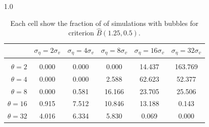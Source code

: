 \documentclass[12pt]{article}
\begin{document}
\begin{table}[h!]
\vspace{10pt}
\begin{subtable}{1.0\textwidth}
    \centering
\begin{tabular}{rccccc}
\hline  
            & \multicolumn{1}{l}{$\sigma_{\eta} =2\sigma_{v}$} & \multicolumn{1}{l}{$\sigma_{\eta} =4\sigma_{v}$} & \multicolumn{1}{l}{$\sigma_{\eta} =8\sigma_{v}$} & \multicolumn{1}{l}{$\sigma_{\eta} =16\sigma_{v}$} & \multicolumn{1}{l}{$\sigma_{\eta} =32\sigma_{v}$} \\ \hline  \vspace{-3mm} \\        
$\theta=2$  & 0.000                                             & 0.000                                             & 0.000                                             & 14.437                                             & 163.769                                            \\ \hline
$\theta=4$  & 0.000                                             & 0.000                                             & 2.588                                             & 62.623                                             & 52.377                                             \\ \hline
$\theta=8$  & 0.000                                             & 0.581                                             & 16.166                                            & 23.705                                             & 25.506                                             \\ \hline
$\theta=16$ & 0.915                                             & 7.512                                             & 10.846                                            & 13.188                                             & 0.143                                              \\ \hline
$\theta=32$ & 4.016                                             & 6.334                                             & 5.830                                             & 0.069                                              & 0.000                                              \\ \hline
\end{tabular}
\end{subtable}

\caption{Each cell show the fraction of of simulations with bubbles for criterion $\widehat{B}(1.25,0.5)$.}
\label{bub25ac5samps}
\end{table}
\pagebreak
\end{document}
